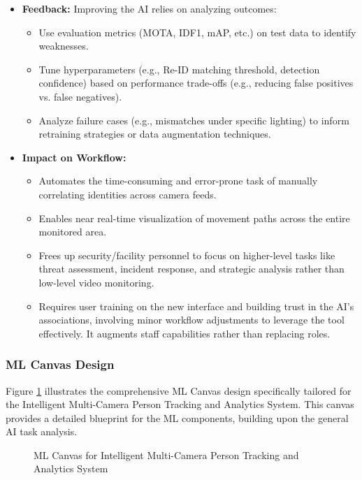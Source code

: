 \begin{itemize}
    \item \textbf{Feedback:} Improving the AI relies on analyzing outcomes:
        \begin{itemize}
            \item Use evaluation metrics (MOTA, IDF1, mAP, etc.) on test data to identify weaknesses.
            \item Tune hyperparameters (e.g., Re-ID matching threshold, detection confidence) based on performance trade-offs (e.g., reducing false positives vs. false negatives).
            \item Analyze failure cases (e.g., mismatches under specific lighting) to inform retraining strategies or data augmentation techniques.
        \end{itemize}

    \item \textbf{Impact on Workflow:}
        \begin{itemize}
            \item Automates the time-consuming and error-prone task of manually correlating identities across camera feeds.
            \item Enables near real-time visualization of movement paths across the entire monitored area.
            \item Frees up security/facility personnel to focus on higher-level tasks like threat assessment, incident response, and strategic analysis rather than low-level video monitoring.
            \item Requires user training on the new interface and building trust in the AI's associations, involving minor workflow adjustments to leverage the tool effectively. It augments staff capabilities rather than replacing roles.
        \end{itemize}
\end{itemize}

\subsubsection{ML Canvas Design}
\label{subsubsection:ml_canvas_design}
Figure \ref{fig:ml_canvas} illustrates the comprehensive ML Canvas design specifically tailored for the Intelligent Multi-Camera Person Tracking and Analytics System. This canvas provides a detailed blueprint for the ML components, building upon the general AI task analysis.

\begin{figure}[!htb]
    \centering
    \caption{ML Canvas for Intelligent Multi-Camera Person Tracking and Analytics System}
    \label{fig:ml_canvas}
\end{figure}
\clearpage

